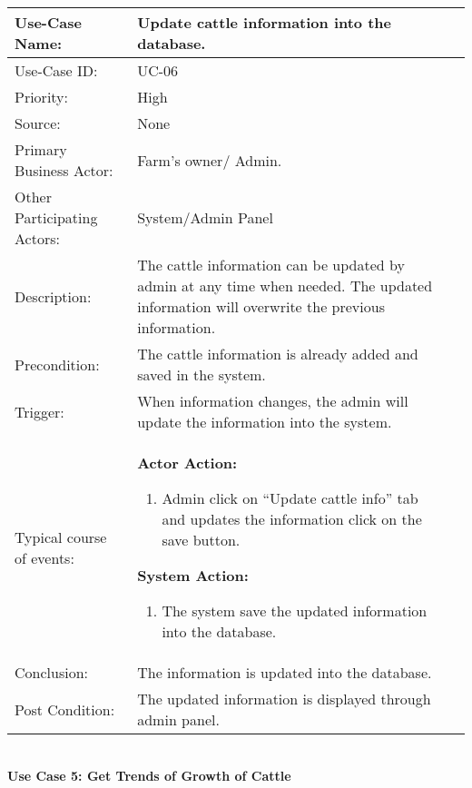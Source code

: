 \begin{tabular}{|l|p{}|p{}|}
	\hline
	Use-Case Name: & Update cattle information into the database. \\ \hline
	Use-Case ID:& UC-06 \\\hline
	Priority:& High\\ \hline
	Source:& None \\ \hline
	Primary Business Actor: & Farm's owner/ Admin.\\ \hline
	Other Participating Actors:&  System/Admin Panel\\ \hline
	Description:& The cattle information can be updated by admin at any time when needed. The updated information will overwrite the previous information.  \\ \hline
	Precondition:& The cattle information is already added and saved in the system.    \\ \hline
	Trigger:& When information changes, the admin will update the information into the system.    \\ \hline 
	Typical course of events:&  \textbf{Actor Action:}
	\begin{enumerate}
		\item Admin click on “Update cattle info” tab and updates the information click on the save button.  
	\end{enumerate}
	\textbf{System Action: }
	\begin{enumerate}
		\item The system save the updated information into the database.
	\end{enumerate}
	
	\\ \hline
	Conclusion:  & The information is updated into the database.\\ \hline
	Post Condition: &The updated information is displayed through admin panel. \\ \hline
\end{tabular}\\


\pagebreak
\textbf{Use Case 5: Get Trends of Growth of Cattle}\\


